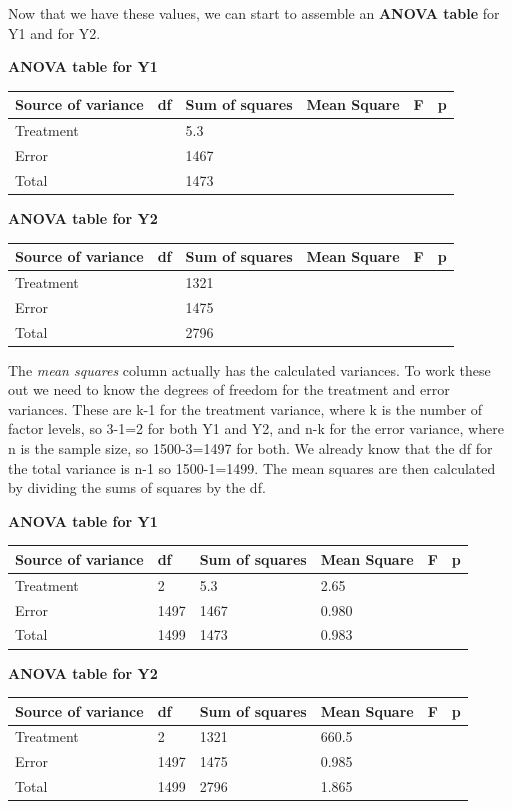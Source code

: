\documentclass[
]{book}
\begin{document}
Now that we have these values, we can start to assemble an \textbf{ANOVA table} for Y1 and for Y2.

\textbf{ANOVA table for Y1}

\begin{longtable}[]{@{}llllll@{}}
\toprule
Source of variance & df & Sum of squares & Mean Square & F & p\tabularnewline
\midrule
\endhead
Treatment & & 5.3 & & &\tabularnewline
Error & & 1467 & & &\tabularnewline
Total & & 1473 & & &\tabularnewline
\bottomrule
\end{longtable}

\textbf{ANOVA table for Y2}

\begin{longtable}[]{@{}llllll@{}}
\toprule
Source of variance & df & Sum of squares & Mean Square & F & p\tabularnewline
\midrule
\endhead
Treatment & & 1321 & & &\tabularnewline
Error & & 1475 & & &\tabularnewline
Total & & 2796 & & &\tabularnewline
\bottomrule
\end{longtable}

The \emph{mean squares} column actually has the calculated variances. To work these out we need to know the degrees of freedom for the treatment and error variances. These are k-1 for the treatment variance, where k is the number of factor levels, so 3-1=2 for both Y1 and Y2, and n-k for the error variance, where n is the sample size, so 1500-3=1497 for both. We already know that the df for the total variance is n-1 so 1500-1=1499. The mean squares are then calculated by dividing the sums of squares by the df.

\textbf{ANOVA table for Y1}

\begin{longtable}[]{@{}llllll@{}}
\toprule
Source of variance & df & Sum of squares & Mean Square & F & p\tabularnewline
\midrule
\endhead
Treatment & 2 & 5.3 & 2.65 & &\tabularnewline
Error & 1497 & 1467 & 0.980 & &\tabularnewline
Total & 1499 & 1473 & 0.983 & &\tabularnewline
\bottomrule
\end{longtable}

\textbf{ANOVA table for Y2}

\begin{longtable}[]{@{}llllll@{}}
\toprule
Source of variance & df & Sum of squares & Mean Square & F & p\tabularnewline
\midrule
\endhead
Treatment & 2 & 1321 & 660.5 & &\tabularnewline
Error & 1497 & 1475 & 0.985 & &\tabularnewline
Total & 1499 & 2796 & 1.865 & &\tabularnewline
\bottomrule
\end{longtable}
\end{document}
